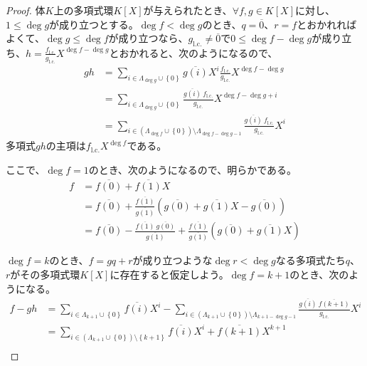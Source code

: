 \documentclass[dvipdfmx]{jsarticle}
\begin{document}
\begin{proof}
体$K$上の多項式環$K[ X]$が与えられたとき、$\forall f,g \in K[ X]$に対し、$1 \leq \deg g$が成り立つとする。$\deg f < \deg g$のとき、$q = \overline{0}$、$r = f$とおかれればよくて、$\deg g \leq \deg f$が成り立つなら、${g}_{\mathrm{l.c.}} \neq \overline{0}$で$0 \leq \deg f - \deg g$が成り立ち、$h = \frac{{f}_{\mathrm{l.c.}}}{{g}_{\mathrm{l.c.}}}X^{\deg f - \deg g}$とおかれると、次のようになるので、
\begin{align*}
gh &= \sum_{i \in \varLambda_{\deg g} \cup \left\{ 0 \right\}} {\overline{g(i)}X^{i}}\frac{{f}_{\mathrm{l.c.}}}{{g}_{\mathrm{l.c.}}}X^{\deg f - \deg g}\\
&= \sum_{i \in \varLambda_{\deg g} \cup \left\{ 0 \right\}} {\frac{\overline{g(i)}\ {f}_{\mathrm{l.c.}}}{{g}_{\mathrm{l.c.}}}X^{\deg f - \deg g + i}}\\
&= \sum_{i \in \left( \varLambda_{\deg f} \cup \left\{ 0 \right\} \right) \setminus \varLambda_{\deg f - \deg g - 1}} {\frac{\overline{g(i)}\ {f}_{\mathrm{l.c.}}}{{g}_{\mathrm{l.c.}}}X^{i}}
\end{align*}
多項式$gh$の主項は${f}_{\mathrm{l.c.}}X^{\deg f}$である。\par
ここで、$\deg f = 1$のとき、次のようになるので、明らかである。
\begin{align*}
f &= \overline{f(0)} + \overline{f(1)}X\\
&= \overline{f(0)} + \frac{\overline{f(1)}}{\overline{g(1)}}\left( \overline{g(0)} + \overline{g(1)}X - \overline{g(0)} \right)\\
&= \overline{f(0)} - \frac{\overline{f(1)}\ \overline{g(0)}}{\overline{g(1)}} + \frac{\overline{f(1)}}{\overline{g(1)}}\left( \overline{g(0)} + \overline{g(1)}X \right)
\end{align*}\par
$\deg f = k$のとき、$f = gq + r$が成り立つような$\deg r < \deg g$なる多項式たち$q$、$r$がその多項式環$K[ X]$に存在すると仮定しよう。$\deg f = k + 1$のとき、次のようになる。
\begin{align*}
f - gh &= \sum_{i \in \varLambda_{k + 1} \cup \left\{ 0 \right\}} {\overline{f(i)}X^{i}} - \sum_{i \in \left( \varLambda_{k + 1} \cup \left\{ 0 \right\} \right) \setminus \varLambda_{k + 1 - \deg g - 1}} {\frac{\overline{g(i)}\ \overline{f(k + 1)}}{{g}_{\mathrm{l.c.}}}X^{i}}\\
&= \sum_{i \in \left( \varLambda_{k + 1} \cup \left\{ 0 \right\} \right) \setminus \left\{ k + 1 \right\}} {\overline{f(i)}X^{i}} + \overline{f(k + 1)}X^{k + 1} \\

\end{align*}
\end{proof}
\end{document}
